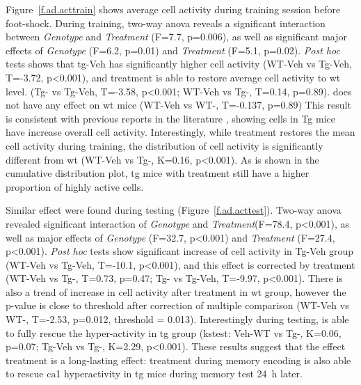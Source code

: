 Figure~\ref{f.ad.acttrain} shows average cell activity during training session before foot-shock. During training, two-way \gls{anova} reveals a significant interaction between \textit{Genotype} and \textit{Treatment} (F=7.7, p=0.006), as well as significant major effects of \textit{Genotype} (F=6.2, p=0.01) and \textit{Treatment} (F=5.1, p=0.02). \textit{Post hoc} tests shows that \gls{tg}-Veh has significantly higher cell activity (WT-Veh vs Tg-Veh, T=-3.72, p<0.001), and \tglu{} treatment is able to restore average cell activity to \gls{wt} level. (Tg-\glu{} vs Tg-Veh, T=-3.58, p<0.001; WT-Veh vs Tg-\glu, T=0.14, p=0.89). \tglu{} does not have any effect on \gls{wt} mice (WT-Veh vs WT-\glu, T=-0.137, p=0.89) This result is consistent with previous reports in the literature \citep{verret12}, showing cells in Tg mice have increase overall cell activity. Interestingly, while \tglu{} treatment restores the mean cell activity during training, the distribution of cell activity is significantly different from \gls{wt} (WT-Veh vs Tg-\glu, K=0.16, p<0.001). As is shown in the cumulative distribution plot, \gls{tg} mice with \tglu{} treatment still have a higher proportion of highly active cells. 

Similar effect were found during testing (Figure~\ref{f.ad.acttest}). Two-way \gls{anova} revealed significant interaction of \textit{Genotype} and \textit{Treatment}(F=78.4, p<0.001), as well as major effects of \textit{Genotype} (F=32.7, p<0.001) and \textit{Treatment} (F=27.4, p<0.001). \textit{Post hoc} tests show significant increase of cell activity in Tg-Veh group (WT-Veh vs Tg-Veh, T=-10.1, p<0.001), and this effect is corrected by \tglu{} treatment (WT-Veh vs Tg-\glu, T=0.73, p=0.47; Tg-\glu{} vs Tg-Veh, T=-9.97, p<0.001). There is also a trend of increase in cell activity after \tglu{} treatment in \gls{wt} group, however the p-value is close to threshold after correction of multiple comparison (WT-Veh vs WT-\glu, T=-2.53, p=0.012, threshold = 0.013). Interestingly during testing, \tglu{} is able to fully rescue the hyper-activity in \gls{tg} group (\gls{kstest}: Veh-WT vs Tg-\glu, K=0.06, p=0.07; Tg-Veh vs Tg-\glu, K=2.29, p<0.001). These results suggest that the effect \tglu{} treatment is a long-lasting effect: treatment during memory encoding is also able to rescue \gls{ca1} hyperactivity in \gls{tg} mice during memory test \SI{24}{\hour} later.

